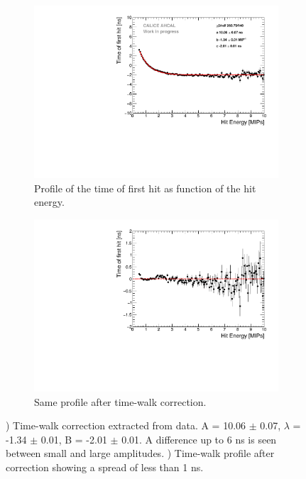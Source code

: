 \begin{figure}[htbp!]
	\begin{subfigure}[t]{0.5\textwidth}
		\centering
		\includegraphics[width=1\textwidth]{chap5/fig_AHCAL_timing/Muons/TimeWalkProfile.pdf}
		\caption{Profile of the time of first hit as function of the hit energy.}\label{fig:time_walk}
	\end{subfigure}
	\hfill
	\begin{subfigure}[t]{0.5\textwidth}
		\centering
		\includegraphics[width=1\textwidth]{chap5/fig_AHCAL_timing/Muons/TimeWalkProfile_Correction.pdf}
		\caption{Same profile after time-walk correction.}\label{fig:time_walk_corr}
	\end{subfigure}
	\caption{) Time-walk correction extracted from data. A = 10.06 $\pm$ 0.07, $\lambda$ = -1.34 $\pm$ 0.01, B = -2.01 $\pm$ 0.01. A difference up to 6 ns is seen between small and large amplitudes. ) Time-walk profile after correction showing a spread of less than 1 ns.}
\end{figure}

